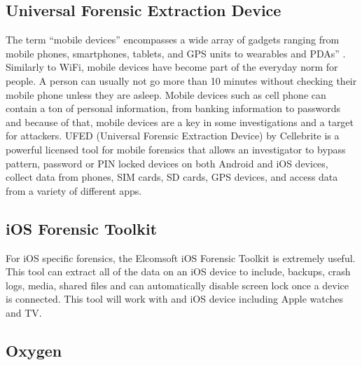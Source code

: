 \documentclass[acmlarge]{style/acmart}
\begin{document}
\subsection{Universal Forensic Extraction Device}

The term “mobile devices” encompasses a wide array of gadgets ranging from mobile phones, smartphones, tablets, and GPS units to wearables and PDAs” \cite{Kostadinov_2019}. Similarly to WiFi, mobile devices have become part of the everyday norm for people. A person can usually not go more than 10 minutes without checking their mobile phone unless they are asleep. Mobile devices such as cell phone can contain a ton of personal information, from banking information to passwords and because of that, mobile devices are a key in some investigations and a target for attackers. 
UFED (Universal Forensic Extraction Device) by Cellebrite is a powerful licensed tool for mobile forensics that allows an investigator to bypass pattern, password or PIN locked devices on both Android and iOS devices, collect data from phones, SIM cards, SD cards, GPS devices, and access data from a variety of different apps. 


\subsection{iOS Forensic Toolkit}

For iOS specific forensics, the Elcomsoft iOS Forensic Toolkit is extremely useful. This tool can extract all of the data on an iOS device to include, backups, crash logs, media, shared files and can automatically disable screen lock once a device is connected. This tool will work with and iOS device including Apple watches and TV. %


\subsection{Oxygen}
\end{document}
